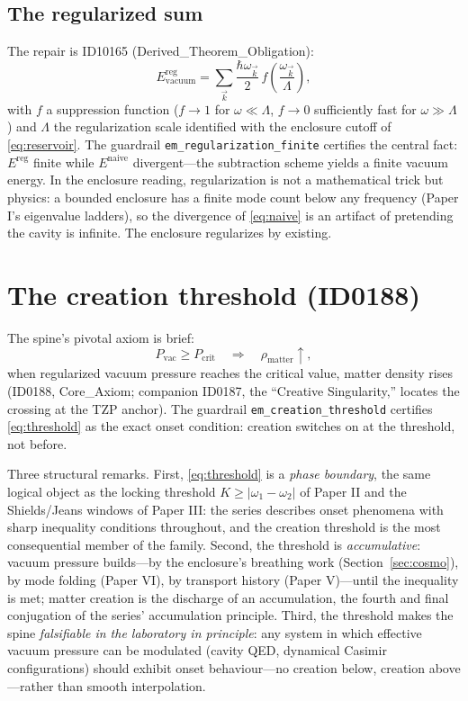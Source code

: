 \documentclass[11pt]{article}
\theoremstyle{remark}
\begin{document}
\subsection{The regularized sum}

The repair is ID10165 (Derived\_Theorem\_Obligation):
\begin{equation}
E^{\mathrm{reg}}_{\mathrm{vacuum}} = \sum_{\vec{k}} \frac{\hbar \omega_{\vec{k}}}{2}\, f\!\left( \frac{\omega_{\vec{k}}}{\Lambda} \right),
\label{eq:reg}
\end{equation}
with $f$ a suppression function ($f \to 1$ for $\omega \ll \Lambda$, $f \to 0$ sufficiently fast for $\omega \gg \Lambda$) and $\Lambda$ the regularization scale identified with the enclosure cutoff of \eqref{eq:reservoir}. The guardrail \texttt{em\_regularization\_finite} certifies the central fact: $E^{\mathrm{reg}}$ finite while $E^{\mathrm{naive}}$ divergent---the subtraction scheme yields a finite vacuum energy. In the enclosure reading, regularization is not a mathematical trick but physics: a bounded enclosure has a finite mode count below any frequency (Paper I's eigenvalue ladders), so the divergence of \eqref{eq:naive} is an artifact of pretending the cavity is infinite. The enclosure regularizes by existing.

\section{The creation threshold (ID0188)}
\label{sec:threshold}

The spine's pivotal axiom is brief:
\begin{equation}
P_{\mathrm{vac}} \geq P_{\mathrm{crit}} \quad \Longrightarrow \quad \rho_{\mathrm{matter}} \uparrow,
\label{eq:threshold}
\end{equation}
when regularized vacuum pressure reaches the critical value, matter density rises (ID0188, Core\_Axiom; companion ID0187, the ``Creative Singularity,'' locates the crossing at the TZP anchor). The guardrail \texttt{em\_creation\_threshold} certifies \eqref{eq:threshold} as the exact onset condition: creation switches on at the threshold, not before.

Three structural remarks. First, \eqref{eq:threshold} is a \emph{phase boundary}, the same logical object as the locking threshold $K \geq |\omega_1 - \omega_2|$ of Paper II and the Shields/Jeans windows of Paper III: the series describes onset phenomena with sharp inequality conditions throughout, and the creation threshold is the most consequential member of the family. Second, the threshold is \emph{accumulative}: vacuum pressure builds---by the enclosure's breathing work (Section~\ref{sec:cosmo}), by mode folding (Paper VI), by transport history (Paper V)---until the inequality is met; matter creation is the discharge of an accumulation, the fourth and final conjugation of the series' accumulation principle. Third, the threshold makes the spine \emph{falsifiable in the laboratory in principle}: any system in which effective vacuum pressure can be modulated (cavity QED, dynamical Casimir configurations) should exhibit onset behaviour---no creation below, creation above---rather than smooth interpolation.
\end{document}
